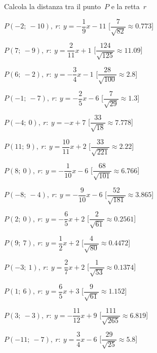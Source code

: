 \begin{esercizio}\label{ese:}
 Calcola la distanza tra il punto~$P$ e la retta~$r$
 \begin{enumeratea}
  \item  $P(-2;~-10),~r:~y = -\dfrac{1}{9} x -11$ \hfill 
   [$\dfrac{7}{\sqrt{82}}\approx 0.773$]
  \item  $P(7;~-9),~r:~y = \dfrac{2}{11} x +1$ \hfill 
   [$\dfrac{124}{\sqrt{125}}\approx 11.09$]
  \item  $P(6;~-2),~r:~y = -\dfrac{3}{4} x -1$ \hfill 
   [$\dfrac{28}{\sqrt{100}}\approx   2.8$]
  \item  $P(-1;~-7),~r:~y = -\dfrac{2}{5} x -6$ \hfill 
   [$\dfrac{7}{\sqrt{29}}\approx   1.3$]
  \item  $P(-4;~0),~r:~y = - x +7$ \hfill 
   [$\dfrac{33}{\sqrt{18}}\approx 7.778$]
  \item  $P(11;~9),~r:~y = \dfrac{10}{11} x +2$ \hfill 
   [$\dfrac{33}{\sqrt{221}}\approx  2.22$]
  \item  $P(8;~0),~r:~y = -\dfrac{1}{10} x -6$ \hfill 
   [$\dfrac{68}{\sqrt{101}}\approx 6.766$]
  \item  $P(-8;~-4),~r:~y = -\dfrac{9}{10} x -6$ \hfill 
   [$\dfrac{52}{\sqrt{181}}\approx 3.865$]
  \item  $P(2;~0),~r:~y = -\dfrac{6}{5} x +2$ \hfill 
   [$\dfrac{2}{\sqrt{61}}\approx0.2561$]
  \item  $P(9;~7),~r:~y = \dfrac{1}{2} x +2$ \hfill 
   [$\dfrac{4}{\sqrt{80}}\approx0.4472$]
  \item  $P(-3;~1),~r:~y = \dfrac{2}{7} x +2$ \hfill 
   [$\dfrac{1}{\sqrt{53}}\approx0.1374$]
  \item  $P(1;~6),~r:~y = \dfrac{6}{5} x +3$ \hfill 
   [$\dfrac{9}{\sqrt{61}}\approx 1.152$]
  \item  $P(3;~-3),~r:~y = -\dfrac{11}{12} x +9$ \hfill 
   [$\dfrac{111}{\sqrt{265}}\approx 6.819$]
  \item  $P(-11;~-7),~r:~y = \dfrac{3}{4} x -6$ \hfill 
   [$\dfrac{29}{\sqrt{25}}\approx   5.8$]
 \end{enumeratea}
\end{esercizio}

